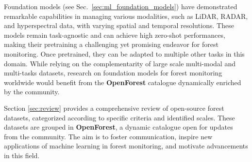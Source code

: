 \documentclass{CUP-JNL-DTM}%
\newcommand{\AOc}[1]{\textcolor{cyan}{[\textbf{Art}: #1]}}
\newcommand{\TKc}[1]{\textcolor{olive}{[\textbf{Tej}: #1]}}
\theoremstyle{definition}
\numberwithin{equation}{section}
\begin{document}
Foundation models (see Sec.~\ref{sec:ml_foundation_models}) have demonstrated remarkable capabilities in managing various modalities, such as LiDAR, RADAR, and hyperspectral data, with varying spatial and temporal resolutions. These models remain task-agnostic and can achieve high zero-shot performances, making their pretraining a challenging yet promising endeavor for forest monitoring. Once pretrained, they can be adapted to multiple other tasks in this domain.
While relying on the complementarity of large scale multi-modal and multi-tasks datasets, research on foundation models for forest monitoring worldwide would benefit from the \textbf{OpenForest} catalogue dynamically enriched by the community.


Section \ref{sec:review} provides a comprehensive review of open-source forest datasets, categorized according to specific criteria and identified scales. These datasets are grouped in \textbf{OpenForest}, a dynamic catalogue open for updates from the community. The aim is to foster communication, inspire new applications of machine learning in forest monitoring, and motivate advancements in this field.




\end{document}
